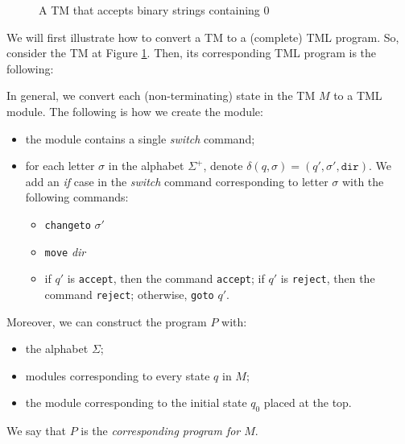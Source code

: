 \begin{appendices}
\begin{figure}[htb]
    \caption{A TM that accepts binary strings containing 0}
    \label{fig:simple_tm}
\end{figure}
We will first illustrate how to convert a TM to a (complete) TML program. So, consider the TM at Figure \ref{fig:simple_tm}. Then, its corresponding TML program is the following:

In general, we convert each (non-terminating) state in the TM $M$ to a TML module. The following is how we create the module:
\begin{itemize}
    \item the module contains a single \textit{switch} command;
    \item for each letter $\sigma$ in the alphabet $\Sigma^+$, denote $\delta(q, \sigma) = (q', \sigma', \texttt{dir})$. We add an \textit{if} case in the \textit{switch} command corresponding to letter $\sigma$ with the following commands:
    \begin{itemize}
        \item \texttt{changeto} $\sigma'$
        \item \texttt{move} \textit{dir}
        \item if $q'$ is \texttt{accept}, then the command \texttt{accept}; if $q'$ is \texttt{reject}, then the command \texttt{reject}; otherwise, \texttt{goto} $q'$.
    \end{itemize}
\end{itemize}
Moreover, we can construct the program $P$ with:
\begin{itemize}
    \item the alphabet $\Sigma$;
    \item modules corresponding to every state $q$ in $M$;
    \item the module corresponding to the initial state $q_0$ placed at the top.
\end{itemize}
We say that $P$ is the \emph{corresponding program for $M$}.


\end{appendices}
